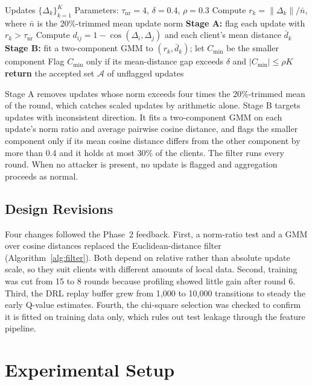 \documentclass[iicol,Numbered]{sn-jnl}
\begin{document}
\begin{algorithm}[t]
\caption{Two-stage norm-ratio and GMM update filter}
\label{alg:filter}
\begin{algorithmic}[1]
\Require Updates $\{\Delta_k\}_{k=1}^{K}$
\Statex \hspace{\algorithmicindent}Parameters: $\tau_{\mathrm{nr}}=4$, $\delta=0.4$, $\rho=0.3$
\State Compute $r_k=\|\Delta_k\|/\bar n$, where $\bar n$ is the 20\%-trimmed mean update norm
\State \textbf{Stage A:} flag each update with $r_k>\tau_{\mathrm{nr}}$
\State Compute $d_{ij}=1-\cos(\Delta_i,\Delta_j)$ and each client's mean distance $\bar d_k$
\State \textbf{Stage B:} fit a two-component GMM to $(r_k,\bar d_k)$; let $C_{\min}$ be the smaller component
\Statex Flag $C_{\min}$ only if its mean-distance gap exceeds $\delta$ and $|C_{\min}|\le\rho K$
\State \textbf{return} the accepted set $\mathcal{A}$ of unflagged updates
\end{algorithmic}
\end{algorithm}

Stage A removes updates whose norm exceeds four times the 20\%-trimmed mean of
the round, which catches scaled updates by arithmetic alone. Stage B targets
updates with inconsistent direction. It fits a two-component GMM on each
update's norm ratio and average pairwise cosine distance, and flags the smaller
component only if its mean cosine distance differs from the other component by
more than 0.4 and it holds at most 30\% of the clients. The filter runs every
round. When no attacker is present, no update is flagged and aggregation
proceeds as normal.

\subsection{Design Revisions}

Four changes followed the Phase~2 feedback. First, a norm-ratio test and a GMM
over cosine distances replaced the Euclidean-distance filter
(Algorithm~\ref{alg:filter}). Both depend on relative rather than absolute
update scale, so they suit clients with different amounts of local data. Second,
training was cut from 15 to 8 rounds because profiling showed little gain after
round 6. Third, the DRL replay buffer grew from 1,000 to 10,000 transitions to
steady the early Q-value estimates. Fourth, the chi-square selection was checked
to confirm it is fitted on training data only, which rules out test leakage
through the feature pipeline.

\section{Experimental Setup}\label{sec:setup}
\end{document}
